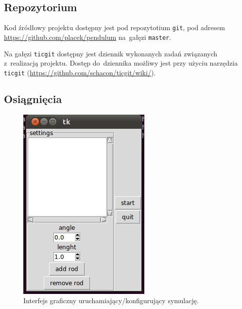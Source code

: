 \documentclass{classrep}
\begin{document}
\subsection{Repozytorium}

Kod źródłowy projektu dostępny jest pod repozytotium \texttt{git}, pod adresem
\url{https://github.com/placek/pendulum} na~gałęzi \texttt{master}.


Na gałęzi \texttt{ticgit} dostępny jest dziennik wykonanych zadań związanych
z~realizacją projektu. Dostęp do~dziennika możliwy jest przy użyciu narzędzia
\texttt{ticgit} (\url{https://github.com/schacon/ticgit/wiki/}).

\subsection{Osiągnięcia}

\begin{figure}[htb]
  \centering
  \includegraphics[scale=0.5]{img/gui.png}
  \caption{Interfejs graficzny uruchamiający/konfigurujący symulację.}
  \label{img:gui}
\end{figure}
\end{document}

